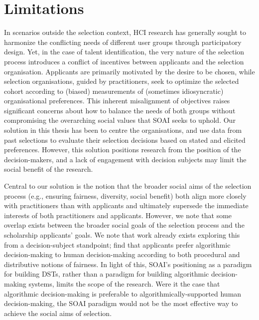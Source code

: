 
\section{Limitations}
In scenarios outside the selection context, HCI research has generally sought to harmonize the conflicting needs of different user groups through participatory design. Yet, in the case of talent identification, the very nature of the selection process introduces a conflict of incentives between applicants and the selection organisation. Applicants are primarily motivated by the desire to be chosen, while selection organisations, guided by practitioners, seek to optimize the selected cohort according to (biased) measurements of (sometimes idiosyncratic) organisational preferences. This inherent misalignment of objectives raises significant concerns about how to balance the needs of both groups without compromising the overarching social values that SOAI seeks to uphold. Our solution in this thesis has been to centre the organisations, and use data from past selections to evaluate their selection decisions based on stated and elicited preferences. However, this solution positions research from the position of the decision-makers, and a lack of engagement with decision subjects may limit the social benefit of the research.

Central to our solution is the notion that the broader social aims of the selection process (e.g., ensuring fairness, diversity, social benefit) both align more closely with practitioners than with applicants and ultimately supersede the immediate interests of both practitioners and applicants. However, we note that some overlap exists between the broader social goals of the selection process and the scholarship applicants' goals. We note that work already exists exploring this from a decision-subject standpoint; \textcite{10.1145/3351095.3372867} find that applicants prefer algorithmic decision-making to human decision-making according to both procedural and distributive notions of fairness. In light of this, SOAI's positioning as a paradigm for building DSTs, rather than a paradigm for building algorithmic decision-making systems, limits the scope of the research. Were it the case that algorithmic decision-making is preferable to algorithmically-supported human decision-making, the SOAI paradigm would not be the most effective way to achieve the social aims of selection.

